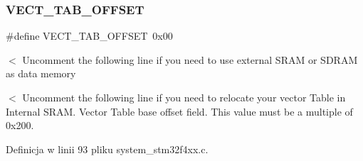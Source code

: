 \subsubsection{\texorpdfstring{V\+E\+C\+T\+\_\+\+T\+A\+B\+\_\+\+O\+F\+F\+S\+ET}{VECT\_TAB\_OFFSET}}
{\footnotesize\ttfamily \#define V\+E\+C\+T\+\_\+\+T\+A\+B\+\_\+\+O\+F\+F\+S\+ET~0x00}

$<$ Uncomment the following line if you need to use external S\+R\+AM or S\+D\+R\+AM as data memory

$<$ Uncomment the following line if you need to relocate your vector Table in Internal S\+R\+AM. Vector Table base offset field. This value must be a multiple of 0x200. 

Definicja w linii 93 pliku system\+\_\+stm32f4xx.\+c.

